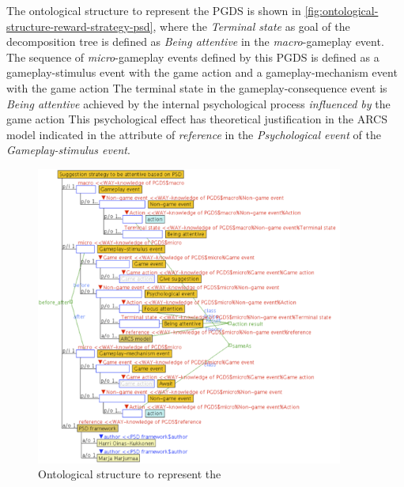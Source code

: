 The ontological structure to represent the PGDS  is shown in \autoref{fig:ontological-structure-reward-strategy-psd}, where the \emph{Terminal state} as goal of the decomposition tree is defined as \emph{Being attentive} in the \emph{macro}-gameplay event.
The sequence of \emph{micro}-gameplay events defined by this PGDS is defined as a gameplay-stimulus event with the game action  and a gameplay-mechanism event with the game action 
The terminal state in the gameplay-consequence event is \emph{Being attentive} achieved by the internal psychological process  \emph{influenced by} the game action 
This psychological effect has theoretical justification in the ARCS model \cite{Keller1987} indicated in the attribute of \emph{reference} in the \emph{Psychological event} of the \emph{Gameplay-stimulus event}.

\begin{figure}[!htb]
 \caption[Ontological structure to represent the \emph{Suggestion strategy to be attentive based on PSD}]{Ontological structure to represent the }
 \label{fig:ontological-structure-reward-strategy-psd}
 \centering
 \includegraphics[width=0.9\textwidth]{images/chap-ontogacles2/ontological-structure-reward-strategy-psd.png}
 \fautor
\end{figure}

